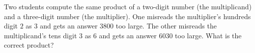 Two students compute the same product of a two-digit number (the multiplicand) and a three-digit number (the multiplier). One misreads the multiplier's hundreds digit $2$ as $3$ and gets an answer $3800$ too large. The other misreads the multiplicand's tens digit $3$ as $6$ and gets an answer $6030$ too large. What is the correct product?
